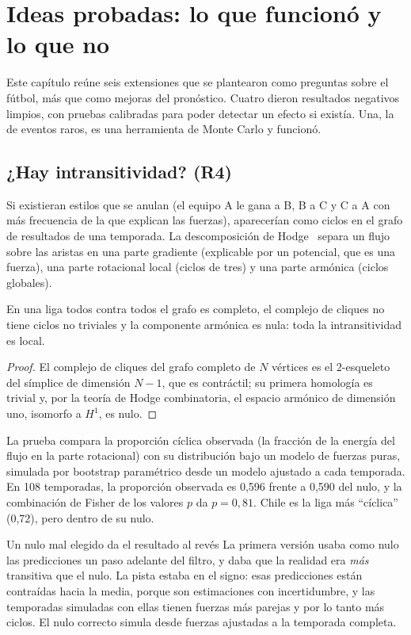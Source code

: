 \chapter{Ideas probadas: lo que funcionó y lo que no}
\label{cap:extensiones}

Este capítulo reúne seis extensiones que se plantearon como preguntas sobre el fútbol, más que como mejoras del pronóstico. Cuatro dieron resultados negativos limpios, con pruebas calibradas para poder detectar un efecto si existía. Una, la de eventos raros, es una herramienta de Monte Carlo y funcionó.

\section{¿Hay intransitividad? (R4)}

Si existieran estilos que se anulan (el equipo A le gana a B, B a C y C a A con más frecuencia de la que explican las fuerzas), aparecerían como ciclos en el grafo de resultados de una temporada. La descomposición de Hodge~\cite{jiang2011} separa un flujo sobre las aristas en una parte gradiente (explicable por un potencial, que es una fuerza), una parte rotacional local (ciclos de tres) y una parte armónica (ciclos globales).

\begin{proposicion} \dem
En una liga todos contra todos el grafo es completo, el complejo de cliques no tiene ciclos no triviales y la componente armónica es nula: toda la intransitividad es local.
\end{proposicion}

\begin{proof}
El complejo de cliques del grafo completo de $N$ vértices es el $2$-esqueleto del símplice de dimensión $N-1$, que es contráctil; su primera homología es trivial y, por la teoría de Hodge combinatoria, el espacio armónico de dimensión uno, isomorfo a $H^1$, es nulo.
\end{proof}

La prueba compara la proporción cíclica observada (la fracción de la energía del flujo en la parte rotacional) con su distribución bajo un modelo de fuerzas puras, simulada por bootstrap paramétrico desde un modelo ajustado a cada temporada. En 108 temporadas, la proporción observada es 0,596 frente a 0,590 del nulo, y la combinación de Fisher de los valores $p$ da $p=0{,}81$. Chile es la liga más ``cíclica'' (0,72), pero dentro de su nulo.

\begin{nota}{Un nulo mal elegido da el resultado al revés}
La primera versión usaba como nulo las predicciones un paso adelante del filtro, y daba que la realidad era \emph{más} transitiva que el nulo. La pista estaba en el signo: esas predicciones están contraídas hacia la media, porque son estimaciones con incertidumbre, y las temporadas simuladas con ellas tienen fuerzas más parejas y por lo tanto más ciclos. El nulo correcto simula desde fuerzas ajustadas a la temporada completa.
\end{nota}

